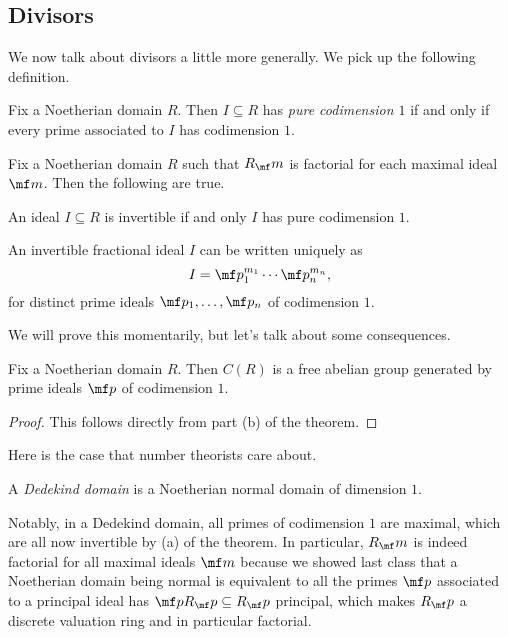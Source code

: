 \subsection{Divisors}
We now talk about divisors a little more generally. We pick up the following definition.
\begin{definition}
	Fix a Noetherian domain $R$. Then $I\subseteq R$ has \textit{pure codimension $1$} if and only if every prime associated to $I$ has codimension $1$.
\end{definition}
\begin{theorem} \label{thm:upfforideals}
	Fix a Noetherian domain $R$ such that $R_\mf m$ is factorial for each maximal ideal $\mf m$. Then the following are true.
	\begin{listalph}
		\item An ideal $I\subseteq R$ is invertible if and only $I$ has pure codimension $1$.
		\item An invertible fractional ideal $I$ can be written uniquely as
		\[I=\mf p_1^{m_1}\cdots\mf p_n^{m_n},\]
		for distinct prime ideals $\mf p_1,\ldots,\mf p_n$ of codimension $1$.
	\end{listalph}
\end{theorem}
We will prove this momentarily, but let's talk about some consequences.
\begin{corollary}
	Fix a Noetherian domain $R$. Then $C(R)$ is a free abelian group generated by prime ideals $\mf p$ of codimension $1$.
\end{corollary}
\begin{proof}
	This follows directly from part (b) of the theorem.
\end{proof}
Here is the case that number theorists care about.
\begin{definition}[Dedekind]
	A \textit{Dedekind domain} is a Noetherian normal domain of dimension $1$.
\end{definition}
Notably, in a Dedekind domain, all primes of codimension $1$ are maximal, which are all now invertible by (a) of the theorem. In particular, $R_\mf m$ is indeed factorial for all maximal ideals $\mf m$ because we showed last class that a Noetherian domain being normal is equivalent to all the primes $\mf p$ associated to a principal ideal has $\mf pR_\mf p\subseteq R_\mf p$ principal, which makes $R_\mf p$ a discrete valuation ring and in particular factorial.

